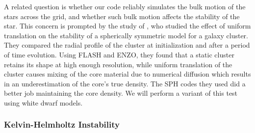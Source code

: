\documentclass{emulateapj}
\begin{document}
A related question is whether our code reliably simulates the bulk
motion of the stars across the grid, and whether such bulk motion
affects the stability of the star. This concern is prompted by the
study of \cite{tasker:2008}, who studied the effect of uniform
translation on the stability of a spherically symmetric model for a
galaxy cluster. They compared the radial profile of the cluster at
initialization and after a period of time evolution. Using FLASH and
ENZO, they found that a static cluster retains its shape at high
enough resolution, while uniform translation of the cluster causes
mixing of the core material due to numerical diffusion which results
in an underestimation of the core's true density. The SPH codes they
used did a better job maintaining the core density. We will perform a
variant of this test using white dwarf models.

\subsubsection{Kelvin-Helmholtz Instability}\label{sec:khi}
\end{document}
